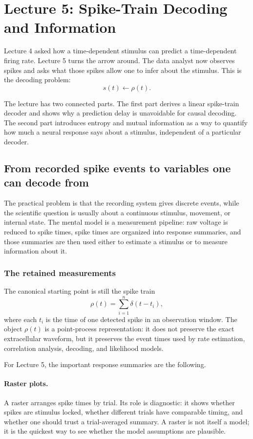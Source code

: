 \section{Lecture 5: Spike-Train Decoding and Information}
\label{sec:aand-spikes-lecture-5}

Lecture 4 asked how a time-dependent stimulus can predict a time-dependent firing rate. Lecture 5 turns the arrow around. The data analyst now observes spikes and asks what those spikes allow one to infer about the stimulus. This is the decoding problem:
\[
    s(t) \longleftarrow \rho(t).
\]

The lecture has two connected parts. The first part derives a linear spike-train decoder and shows why a prediction delay is unavoidable for causal decoding. The second part introduces entropy and mutual information as a way to quantify how much a neural response says about a stimulus, independent of a particular decoder.

\subsection{From recorded spike events to variables one can decode from}

The practical problem is that the recording system gives discrete events, while the scientific question is usually about a continuous stimulus, movement, or internal state. The mental model is a measurement pipeline: raw voltage is reduced to spike times, spike times are organized into response summaries, and those summaries are then used either to estimate a stimulus or to measure information about it.

\subsubsection{The retained measurements}

The canonical starting point is still the spike train
\[
    \rho(t)=\sum_{i=1}^{n}\delta(t-t_i),
\]
where each $t_i$ is the time of one detected spike in an observation window. The object $\rho(t)$ is a point-process representation: it does not preserve the exact extracellular waveform, but it preserves the event times used by rate estimation, correlation analysis, decoding, and likelihood models.

For Lecture 5, the important response summaries are the following.

\paragraph{Raster plots.}
A raster arranges spike times by trial. Its role is diagnostic: it shows whether spikes are stimulus locked, whether different trials have comparable timing, and whether one should trust a trial-averaged summary. A raster is not itself a model; it is the quickest way to see whether the model assumptions are plausible.

